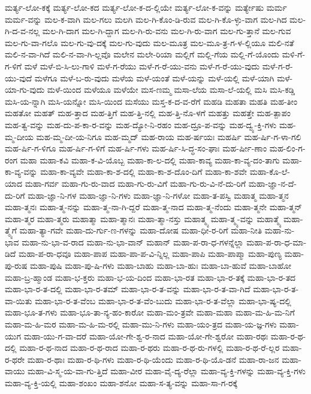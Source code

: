 {ಮರ್ತ್ಯ-ಲೋ-ಕಕ್ಕೆ
ಮರ್ತ್ಯ-ಲೋ-ಕದ
ಮರ್ತ್ಯ-ಲೋ-ಕ-ದ-ಲ್ಲಿಯೇ
ಮರ್ತ್ಯ-ಲೋ-ಕ-ವನ್ನು
ಮರ್ತ್ಯೇಷು
ಮರ್ಮ
ಮರ್ಮ-ವನ್ನು
ಮಲ-ಕ-ವಾಗಿ
ಮಲ-ಗಲು
ಮಲಗಿ
ಮಲ-ಗಿ-ಕೊಂ-ಡಿ-ರುವ
ಮಲ-ಗಿ-ಕೊ-ಳ್ಳು-ವಾಗ
ಮಲ-ಗಿದ
ಮಲ-ಗಿ-ದ-ವ-ನಲ್ಲ
ಮಲ-ಗಿ-ದಾಗ
ಮಲ-ಗಿ-ದ್ದಾಗ
ಮಲ-ಗಿ-ರು-ವನು
ಮಲ-ಗಿ-ರು-ವಾಗ
ಮಲ-ಗು-ತ್ತಾನೆ
ಮಲ-ಗುವ
ಮಲ-ಗು-ವಾ-ಗಲೊ
ಮಲ-ಗು-ವು-ದಕ್ಕೆ
ಮಲ-ಗು-ವುದು
ಮಲ-ಮೂತ್ರ
ಮಲ-ಮೂ-ತ್ರ-ಗ-ಳ-ಲ್ಲಿಯೂ
ಮಲಿ-ನತೆ
ಮಲಿ-ನ-ವಾ-ಗಿದೆ
ಮಲಿ-ನ-ವಾ-ಗಿ-ಲ್ಲವೊ
ಮಲೇನ
ಮಲೇ-ರಿಯಾ
ಮಲ್ಲಿಗೆ
ಮಲ್ಲಿ-ಗೆಯ
ಮಲ್ಲಿ-ಗೆ-ಯೊಂದು
ಮಳಿ-ಗೆ-ಗ-ಳಿಗೆ
ಮಳೆ
ಮಳೆ-ಬಿ-ಸಿ-ಲು-ಗಾಳಿ
ಮಳೆ-ಗ-ರೆಯು
ಮಳೆ-ಗ-ರೆ-ಯು-ವನು
ಮಳೆ-ಗ-ರೆ-ಯು-ವುದು
ಮಳೆ-ಗ-ರೆ-ಯು-ವುದೆ
ಮಳೆಗೂ
ಮಳೆ-ಬ-ರು-ವುದು
ಮಳೆಯ
ಮಳೆ-ಯಂತೆ
ಮಳೆ-ಯನ್ನು
ಮಳೆ-ಯಲ್ಲಿ
ಮಳೆ-ಯಾಗಿ
ಮಳೆ-ಯಾ-ಗು-ವುದು
ಮಳೆ-ಯಿಂದ
ಮಳೆಯೂ
ಮಳೆಯೇ
ಮಸ-ಣಮ್ಮ
ಮಸಾ-ಲೆಯ
ಮಸಾ-ಲೆ-ಯಲ್ಲಿ
ಮಸಿ
ಮಸಿ-ಕಡ್ಡಿ
ಮಸಿ-ಯ-ನ್ನಾಗಿ
ಮಸಿ-ಯನ್ನೋ
ಮಸಿ-ಯಿಂದ
ಮಸೆಯು
ಮಸ್ತ-ಕ-ದ-ವ-ರೆಗೆ
ಮಹಡಿ
ಮಹತಾ
ಮಹತಿ
ಮಹ-ತೀಂ
ಮಹತೋ
ಮಹತ್
ಮಹ-ತ್ತಾದ
ಮಹ-ತ್ತಿಗೆ
ಮಹ-ತ್ತಿ-ನಲ್ಲಿ
ಮಹ-ತ್ತಿ-ನೊ-ಳಗೆ
ಮಹತ್ತು
ಮಹತ್ತೇ
ಮಹ-ತ್ಪಾಪಂ
ಮಹ-ತ್ವ-ವನ್ನು
ಮಹ-ದು-ಪ-ಕಾ-ರ-ವನ್ನು
ಮಹ-ದ್ಯೋ-ನಿ-ರಹಂ
ಮಹ-ದ್ರೂ-ಪ-ವನ್ನು
ಮಹ-ದ್ವ್ಯ-ಕ್ತಿ-ಗಳು
ಮಹ-ಮ್ಮ-ದೀಯ
ಮಹ-ಮ್ಮ-ದೀ-ಯ-ನಿಗೂ
ಮಹ-ಮ್ಮದ್
ಮಹ-ರಾಯ
ಮಹ-ರ್ಷಯಃ
ಮಹರ್ಷಿ
ಮಹ-ರ್ಷಿ-ಗ-ಳಾ-ಗಲಿ
ಮಹ-ರ್ಷಿ-ಗ-ಳಿಗೂ
ಮಹ-ರ್ಷಿ-ಗ-ಳಿಗೆ
ಮಹ-ರ್ಷಿ-ಗಳು
ಮಹ-ರ್ಷಿ-ಸಿ-ದ್ಧ-ಸಂ-ಘಾಃ
ಮಹ-ರ್ಷೀ-ಣಾಂ
ಮಹ-ಲಿಂ-ಗ-ರಂಗ
ಮಹಾ
ಮಹಾ-ಕವಿ
ಮಹಾ-ಕ-ವಿ-ಯೊಬ್ಬ
ಮಹಾ-ಕಾ-ಲ-ದಲ್ಲಿ
ಮಹಾ-ಕಾವ್ಯ
ಮಹಾ-ಕಾ-ವ್ಯ-ದಂ-ತಾಗು
ಮಹಾ-ಕಾ-ವ್ಯ-ವನ್ನು
ಮಹಾ-ಕಾ-ವ್ಯವೇ
ಮಹಾ-ಕಾ-ಶ-ದಲ್ಲಿ
ಮಹಾ-ಕಾ-ಶ-ದೊಂ-ದಿಗೆ
ಮಹಾ-ಕಾ-ಶವೇ
ಮಹಾ-ಕೊ-ಲೆ-ಯಾದ
ಮಹಾ-ಗರ್ವ
ಮಹಾ-ಗು-ರು-ವಾದ
ಮಹಾ-ಗು-ರು-ವಿಗೆ
ಮಹಾ-ಗು-ರು-ವಿ-ನೆ-ದು-ರಿಗೆ
ಮಹಾ-ಜ್ಞಾ-ನ-ದೆ-ದು-ರಿಗೆ
ಮಹಾ-ಜ್ಞಾ-ನಿ-ಗಳ
ಮಹಾ-ಜ್ಞಾ-ನಿ-ಗಳು
ಮಹಾ-ಜ್ಞಾ-ನಿ-ಗಳೋ
ಮಹಾ-ತ-ಪಸ್ವಿ
ಮಹಾತ್ಮ
ಮಹಾ-ತ್ಮನ
ಮಹಾ-ತ್ಮನಃ
ಮಹಾ-ತ್ಮ-ನನ್ನು
ಮಹಾ-ತ್ಮ-ನಾ-ಗಿ-ದ್ದರೆ
ಮಹಾ-ತ್ಮ-ನಾದ
ಮಹಾ-ತ್ಮ-ನೆಂದು
ಮಹಾ-ತ್ಮನೇ
ಮಹಾ-ತ್ಮನ್
ಮಹಾ-ತ್ಮರ
ಮಹಾ-ತ್ಮರು
ಮಹಾತ್ಮಾ
ಮಹಾ-ತ್ಮಾನಃ
ಮಹಾ-ತ್ಮಾ-ನಸ್ತು
ಮಹಾತ್ಮ್ಯ
ಮಹಾ-ತ್ಮ್ಯ-ವನ್ನು
ಮಹಾತ್ಮ್ಯೆ
ಮಹಾ-ತ್ಮ್ಯೆಗೆ
ಮಹಾ-ತ್ಯಾ-ಗವೇ
ಮಹಾ-ದು-ರ್ಗು-ಣ-ಗಳನ್ನು
ಮಹಾ-ದೋಷ
ಮಹಾ-ಧೀ-ರ-ರಿಗೆ
ಮಹಾ-ನೀತಿ
ಮಹಾ-ನು-ಭಾವ
ಮಹಾ-ನು-ಭಾ-ವ-ರಾದ
ಮಹಾ-ನು-ಭಾ-ವಾನ್
ಮಹಾನ್
ಮಹಾ-ಪ-ರಾ-ಧ-ಗಳನ್ನೆಲ್ಲಾ
ಮಹಾ-ಪ-ರಾ-ಧ-ಮಾ-ಡಿದೆ
ಮಹಾ-ಪ-ರಾ-ಧವೂ
ಮಹಾ-ಪಾಪ
ಮಹಾ-ಪಾ-ಪ-ವಿ-ನ್ನಿಲ್ಲ
ಮಹಾ-ಪಾಪಿ
ಮಹಾ-ಪಾಪ್ಮಾ
ಮಹಾ-ಪುಣ್ಯ
ಮಹಾ-ಪು-ರುಷ
ಮಹಾ-ಪುಷಿ
ಮಹಾ-ಪು-ಷಿ-ಗಳು
ಮಹಾ-ಬಾಹು
ಮಹಾ-ಬಾ-ಹುಃ
ಮಹಾ-ಬಾ-ಹುವೆ
ಮಹಾ-ಬಾಹೋ
ಮಹಾ-ಬ್ರ-ಹ್ಮಾಂಡ
ಮಹಾ-ಭ-ಕ್ತರು
ಮಹಾ-ಭ-ಯ-ದಿಂದ
ಮಹಾ-ಭಾ-ರತ
ಮಹಾ-ಭಾ-ರ-ತಕ್ಕೆ
ಮಹಾ-ಭಾ-ರ-ತದ
ಮಹಾ-ಭಾ-ರ-ತ-ದಲ್ಲಿ
ಮಹಾ-ಭಾ-ರ-ತಮ್
ಮಹಾ-ಭಾ-ರ-ತ-ವನ್ನು
ಮಹಾ-ಭಾ-ರ-ತ-ವಾ-ಗಿದೆ
ಮಹಾ-ಭಾ-ರ-ತ-ವಾ-ಯಿತು
ಮಹಾ-ಭಾ-ರ-ತ-ವೆಂಬ
ಮಹಾ-ಭಾ-ರ-ತ-ವೆಂ-ಬುದು
ಮಹಾ-ಭಾ-ರ-ತ-ವೆಲ್ಲಾ
ಮಹಾ-ಭಾ-ಷ್ಯ-ದಲ್ಲಿ
ಮಹಾ-ಭೂ-ತ-ಗಳು
ಮಹಾ-ಭೂ-ತಾ-ನ್ಯ-ಹಂ-ಕಾರೋ
ಮಹಾ-ಮಂ-ತ್ರವೇ
ಮಹಾ-ಮಹಾ
ಮಹಾ-ಮ-ಹಿ-ಮ-ನಿಗೆ
ಮಹಾ-ಮ-ಹಿ-ಮರ
ಮಹಾ-ಮ-ಹಿ-ಮ-ರಲ್ಲಿ
ಮಹಾ-ಮು-ನಿ-ಗಳು
ಮಹಾ-ಯಂ-ತ್ರದ
ಮಹಾ-ಯ-ಜ್ಞ-ಗಳು
ಮಹಾ-ಯುಗ
ಮಹಾ-ಯು-ಗ-ವಾ-ದರೆ
ಮಹಾ-ಯೋ-ಗೇ-ಶ್ವ-ರ-ನಾದ
ಮಹಾ-ಯೋ-ಗೇ-ಶ್ವರೋ
ಮಹಾ-ರಥಃ
ಮಹಾ-ರ-ಥ-ದಲ್ಲಿ
ಮಹಾ-ರ-ಥ-ನಾದ
ಮಹಾ-ರ-ಥ-ರಾದ
ಮಹಾ-ರ-ಥರು
ಮಹಾ-ರ-ಥ-ರು-ಗಳಲ್ಲಿ
ಮಹಾ-ರ-ಥ-ರೆ-ಲ್ಲರ
ಮಹಾ-ರ-ಥರೇ
ಮಹಾ-ರ-ಥಾಃ
ಮಹಾ-ರ-ಥಿ-ಗಳು
ಮಹಾ-ರ-ಥಿ-ಯೆಂದು
ಮಹಾ-ರ-ಥಿ-ಯೊ-ಡನೆ
ಮಹಾ-ರಾ-ಜನ
ಮಹಾ-ವಾಯು
ಮಹಾ-ವಿ-ಸ್ಮ-ಯ-ವಾ-ಗು-ತ್ತಿದೆ
ಮಹಾ-ವೀರ
ಮಹಾ-ವೈ-ದ್ಯ-ರೆಲ್ಲಾ
ಮಹಾ-ವ್ಯ-ಕ್ತಿ-ಗಳನ್ನು
ಮಹಾ-ವ್ಯ-ಕ್ತಿ-ಗಳು
ಮಹಾ-ವ್ಯ-ಕ್ತಿ-ಯಲ್ಲಿ
ಮಹಾ-ಶಂಖಂ
ಮಹಾ-ಶನೋ
ಮಹಾ-ಸ-ತ್ಯ-ವನ್ನು
ಮಹಾ-ಸಾ-ಗ-ರಕ್ಕೆ
}
